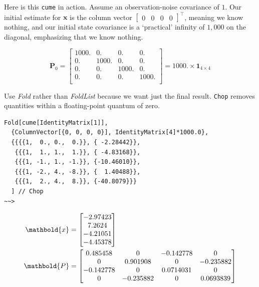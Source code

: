 \documentclass[10pt,oneside,x11names]{article}
\begin{document}
\begin{enumerate}
Here is this \texttt{cume} in action. Assume an observation-noise covariance of \(1\). Our
initial estimate for \(\mathbold{x}\) is the column vector
\(\begin{bmatrix}0& 0& 0& 0\end{bmatrix}^\intercal\),
meaning we
know nothing, and our initial state covariance is a `practical' infinity of
\(1,000\) on the diagonal, emphasizing that we know nothing. 

\begin{equation*}
\mathbold{P}_0 =
\begin{bmatrix}
 1000. & 0. & 0. & 0. \\
 0. & 1000. & 0. & 0. \\
 0. & 0. & 1000. & 0. \\
 0. & 0. & 0. & 1000. \\
\end{bmatrix}
=1000. \times \mathbold{1}_{4\times{4}}
\end{equation*}

Use \emph{Fold} rather than \emph{FoldList} because we want just the final result. \texttt{Chop}
removes quantities within a floating-point quantum of zero.

\begin{verbatim}
Fold[cume[IdentityMatrix[1]],
  {ColumnVector[{0, 0, 0, 0}], IdentityMatrix[4]*1000.0},
  {{{{1,  0., 0.,  0.}}, { -2.28442}}, 
   {{{1,  1., 1.,  1.}}, { -4.83168}}, 
   {{{1, -1., 1., -1.}}, {-10.46010}}, 
   {{{1, -2., 4., -8.}}, {  1.40488}}, 
   {{{1,  2., 4.,  8.}}, {-40.8079}}}
  ] // Chop
~~>
\end{verbatim}

\begin{align}
\label{eqn:kalman-filter-results}
\mathbold{x} &=
\begin{bmatrix}
 -2.97423 \\
  7.2624  \\
 -4.21051 \\
 -4.45378 \\
\end{bmatrix}
\\
\notag
\mathbold{P} &=
\begin{bmatrix}
 0.485458 & 0 & -0.142778 & 0 \\
 0 & 0.901908 & 0 & -0.235882 \\
 -0.142778 & 0 & 0.0714031 & 0 \\
 0 & -0.235882 & 0 & 0.0693839 \\
\end{bmatrix}
\end{align}


\end{enumerate}
\end{document}
